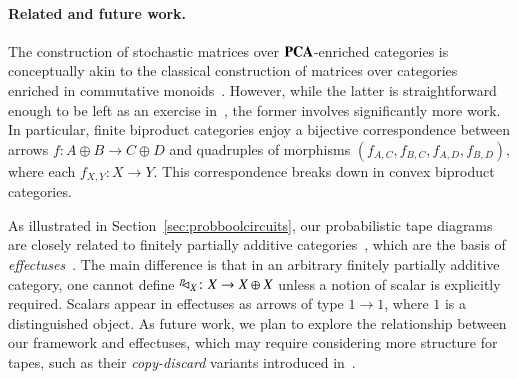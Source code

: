 \paragraph{Related and future work.} The construction of stochastic matrices over $\mathbf{PCA}$-enriched categories is conceptually akin to the classical construction of matrices over categories enriched in commutative monoids~\cite{mac_lane_categories_1978,coecke2017two}. However, while the latter is straightforward enough to be left as an exercise in~\cite{mac_lane_categories_1978}, the former involves significantly more work. In particular, finite biproduct categories enjoy a bijective correspondence between arrows \( f \colon A \oplus B \to C \oplus D \) and quadruples of morphisms \( (f_{A,C}, f_{B,C}, f_{A,D}, f_{B,D}) \), where each \( f_{X,Y} \colon X \to Y \). This correspondence breaks down in convex biproduct categories. 




As illustrated in Section~\ref{sec:probboolcircuits}, our probabilistic tape diagrams are closely related to finitely partially additive categories~\cite{manes}, which are the basis of \emph{effectuses}~\cite{introductioneffectus,chophd}. The main difference is that in an arbitrary finitely partially additive category, one cannot define $^p\!\! \lhd_{X}\colon X \to X\oplus X$ unless a notion of scalar is explicitly required. Scalars appear in {effectuses} as arrows of type \( 1 \to 1 \), where \( 1 \) is a distinguished object. As future work, we plan to explore the relationship between our framework and effectuses, which may require considering more structure for tapes, such as their \emph{copy-discard} variants introduced in~\cite{bonchi2025tapediagramsmonoidalmonads}.






